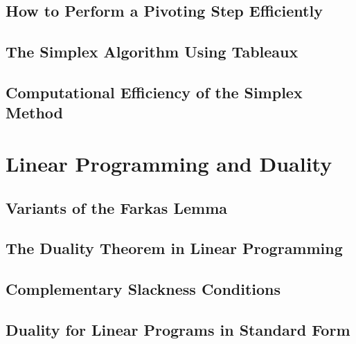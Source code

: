 \documentclass[a4paper]{article}
\begin{document}
\subsection{ How to Perform a Pivoting Step Efficiently} %

\subsection{ The Simplex Algorithm Using Tableaux} %

\subsection{ Computational Efficiency of the Simplex Method} %


\newpage
\section{Linear Programming and Duality}
\subsection{ Variants of the Farkas Lemma} %

\subsection{ The Duality Theorem in Linear Programming} %

\subsection{ Complementary Slackness Conditions} %

\subsection{ Duality for Linear Programs in Standard Form} %
\end{document}
